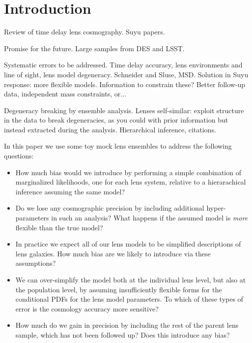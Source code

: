 \documentclass[useAMS,usenatbib]{mn2e}
\begin{document}
\section{Introduction}

Review of time delay lens cosmography. Suyu papers.

Promise for the future. Large samples from DES and LSST.

Systematic errors to be addressed. Time delay accuracy, lens environments and line of sight, lens model degeneracy. Schneider and Sluse, MSD. Solution in Suyu response: more flexible models. Information to constrain these? Better follow-up data, independent mass constraints, or...

Degeneracy breaking by ensemble analysis. Lenses self-similar: exploit structure in the data to break degeneracies, as you could with prior information but instead extracted during the analysis. Hierarchical inference, citations.

In this paper we use some toy mock lens ensembles to address the following questions:

\begin{itemize}

\item How much bias would we introduce by performing a simple combination of marginalized likelihoods, one for each lens system, relative to a hierarachical inference assuming the same model?

\item Do we lose any cosmographic precision by including additional hyper-parameters in such an analysis? What happens if the assumed model is {\it more} flexible than the true model?

\item In practice we expect all of our lens models to be simplified descriptions of lens galaxies. How much bias are we likely to introduce via these assumptions?

\item We can over-simplify the model both at the individual lens level, but also at the population level, by assuming insufficiently flexible forms for the conditional PDFs for the lens model parameters. To which of these types of error is the cosmology accuracy more sensitive?

\item How much do we gain in precision by including the rest of the parent lens sample, which has not been followed up? Does this introduce any bias?

\end{itemize}
\end{document}
